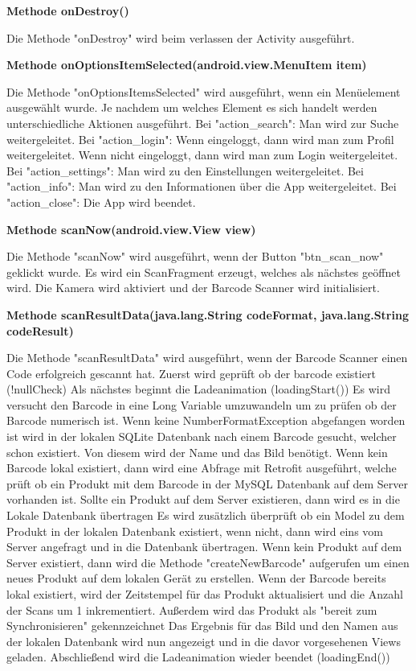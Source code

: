 \documentclass{scrartcl}
\begin{document}
\noindent\textbf{Methode onDestroy()}

\noindent Die Methode "onDestroy" wird beim verlassen der Activity ausgeführt. \newline

\noindent\textbf{Methode onOptionsItemSelected(android.view.MenuItem item)}

\noindent Die Methode "onOptionsItemsSelected" wird ausgeführt, wenn ein Menüelement ausgewählt wurde. Je nachdem um welches Element es sich handelt werden unterschiedliche Aktionen ausgeführt. Bei "action\_search": Man wird zur Suche weitergeleitet. Bei "action\_login": Wenn eingeloggt, dann wird man zum Profil weitergeleitet. Wenn nicht eingeloggt, dann wird man zum Login weitergeleitet. Bei "action\_settings": Man wird zu den Einstellungen weitergeleitet. Bei "action\_info": Man wird zu den Informationen über die App weitergeleitet. Bei "action\_close": Die App wird beendet. \newline

\noindent\textbf{Methode scanNow(android.view.View view)}

\noindent Die Methode "scanNow" wird ausgeführt, wenn der Button "btn\_scan\_now" geklickt wurde. Es wird ein ScanFragment erzeugt, welches als nächstes geöffnet wird. Die Kamera wird aktiviert und der Barcode Scanner wird initialisiert. \newline

\noindent\textbf{Methode scanResultData(java.lang.String codeFormat, java.lang.String codeResult)}

\noindent Die Methode "scanResultData" wird ausgeführt, wenn der Barcode Scanner einen Code erfolgreich gescannt hat. Zuerst wird geprüft ob der barcode existiert (!nullCheck) Als nächstes beginnt die Ladeanimation (loadingStart()) Es wird versucht den Barcode in eine Long Variable umzuwandeln um zu prüfen ob der Barcode numerisch ist. Wenn keine NumberFormatException abgefangen worden ist wird in der lokalen SQLite Datenbank nach einem Barcode gesucht, welcher schon existiert. Von diesem wird der Name und das Bild benötigt. Wenn kein Barcode lokal existiert, dann wird eine Abfrage mit Retrofit ausgeführt, welche prüft ob ein Produkt mit dem Barcode in der MySQL Datenbank auf dem Server vorhanden ist. Sollte ein Produkt auf dem Server existieren, dann wird es in die Lokale Datenbank übertragen Es wird zusätzlich überprüft ob ein Model zu dem Produkt in der lokalen Datenbank existiert, wenn nicht, dann wird eins vom Server angefragt und in die Datenbank übertragen. Wenn kein Produkt auf dem Server existiert, dann wird die Methode "createNewBarcode" aufgerufen um einen neues Produkt auf dem lokalen Gerät zu erstellen. Wenn der Barcode bereits lokal existiert, wird der Zeitstempel für das Produkt aktualisiert und die Anzahl der Scans um 1 inkrementiert. Außerdem wird das Produkt als "bereit zum Synchronisieren" gekennzeichnet Das Ergebnis für das Bild und den Namen aus der lokalen Datenbank wird nun angezeigt und in die davor vorgesehenen Views geladen. Abschließend wird die Ladeanimation wieder beendet (loadingEnd()) \newline
\end{document}
